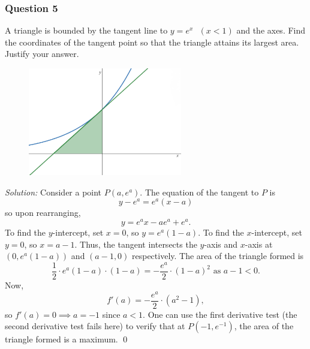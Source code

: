 \documentclass{article}
\begin{document}
\subsubsection*{Question 5}
A triangle is bounded by the tangent line to $y=e^x\text{ }(x<1)$ and the axes. Find the coordinates of the tangent point so that the triangle attains its largest area. Justify your answer.
\begin{figure}[h!]
\centering
\includegraphics[width=0.6\textwidth]{ex.png}
\end{figure}
\newblock
\newline\textit{Solution:} Consider a point $P(a,e^a)$. The equation of the tangent to $P$ is \[y-e^a=e^a(x-a)\] so upon rearranging, \[y=e^ax-ae^a+e^a.\]
To find the $y$-intercept, set $x=0$, so $y=e^a(1-a)$. To find the $x$-intercept, set $y=0$, so $x=a-1$.
\newline\newline Thus, the tangent intersects the $y$-axis and $x$-axis at $(0,e^a(1-a))$ and $(a-1,0)$ respectively. The area of the triangle formed is \[\frac{1}{2}\cdot e^a(1-a) \cdot (1-a)=-\frac{e^a}{2}\cdot (1-a)^2\text{ as }a-1<0.\] Now, \[f'(a)=-\frac{e^a}{2}\cdot (a^2-1),\] so $f'(a)=0 \implies a=-1$ since $a<1$. One can use the first derivative test (the second derivative test fails here) to verify that at $P(-1,e^{-1})$, the area of the triangle formed is a maximum. \qed 
\newpage
\end{document}
